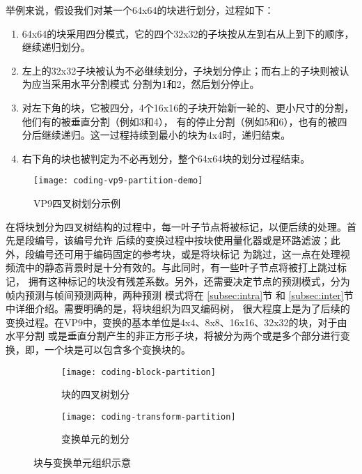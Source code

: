 举例来说，假设我们对某一个64x64的块进行划分，过程如下：
\begin{enumerate}
  \item 64x64的块采用四分模式，它的四个32x32的子块按从左到右从上到下的顺序，继续递归划分。
  \item 左上的32x32子块被认为不必继续划分，子块划分停止；而右上的子块则被认为应当采用水平分割模式
  分割为1和2，然后划分停止。
  \item 对左下角的块，它被四分，4个16x16的子块开始新一轮的、更小尺寸的分割，他们有的被垂直分割（例如3和4），
  有的停止分割（例如5和6），也有的被四分后继续递归。这一过程持续到最小的块为4x4时，递归结束。
  \item 右下角的块也被判定为不必再划分，整个64x64块的划分过程结束。
\end{enumerate}

\begin{figure}[H] %
  \centering
  \texttt{[image: coding-vp9-partition-demo]}
  \caption{VP9四叉树划分示例}
  \label{fig:coding-vp9-partition-demo}
\end{figure}

在将块划分为四叉树结构的过程中，每一叶子节点将被标记，以便后续的处理。首先是段编号，该编号允许
后续的变换过程中按块使用量化器或是环路滤波；此外，段编号还可用于编码固定的参考块，或是将块标记
为跳过，这一点在处理视频流中的静态背景时是十分有效的。与此同时，有一些叶子节点将被打上跳过标记，
拥有这种标记的块没有残差系数。另外，还需要决定节点的预测模式，分为帧内预测与帧间预测两种，两种预测
模式将在 \ref{subsec:intra}节 和 \ref{subsec:inter}节 中详细介绍。需要明确的是，将块组织为四叉编码树，
很大程度上是为了后续的变换过程。在VP9中，变换的基本单位是4x4、8x8、16x16、32x32的块，对于由水平分割
或是垂直分割产生的非正方形子块，将被分为两个或是多个部分进行变换，即，一个块是可以包含多个变换块的。

\begin{figure}[H]
  \centering%
  \begin{subfigure}{0.43\textwidth}
    \centering
    \texttt{[image: coding-block-partition]}
    \caption{块的四叉树划分}
  \end{subfigure}%
  \hspace{2em}%
  \begin{subfigure}{0.43\textwidth}
    \centering
    \texttt{[image: coding-transform-partition]}
    \caption{变换单元的划分}
  \end{subfigure}
  \caption{块与变换单元组织示意}
\end{figure}

